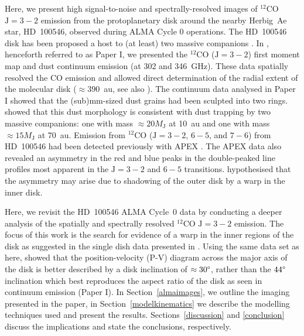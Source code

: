 \documentclass[onecolumn]{aastex6}
\begin{document}
Here, we present high signal-to-noise and spectrally-resolved
images of $^{12}$CO $\mathrm{J}=3-2$ emission from the protoplanetary
disk around the nearby Herbig~Ae star, HD~100546, observed during ALMA Cycle 0 operations.
The HD~100546 disk has been proposed a host to (at least) two
massive companions \citep[see, e.g.,][]{acke06,quanz13,walsh14}.
In \citet{walsh14}, henceforth referred to as Paper I,
we presented the $^{12}$CO ($\mathrm{J}=3-2$) first moment map
and dust continuum emission (at 302 and 346~GHz).
These data spatially resolved the CO emission and allowed direct
determination of the radial extent of the molecular disk ($\approx 390$~au,
see also \citealt{pineda14}).
The continuum data analysed in Paper I showed that the (sub)mm-sized dust grains
had been sculpted into two rings.
\citet{pinilla15} showed that this
dust morphology is consistent with dust trapping by two massive companions:
one with mass $\approx 20 M_\mathrm{J}$ at 10~au and one with mass
$\approx 15 M_\mathrm{J}$ at 70~au.
Emission from $^{12}$CO ($\mathrm{J}=3-2$, $6-5$, and $7-6$) from HD~100546
had been detected previously with APEX \citep{panic10}.
The APEX data also revealed an asymmetry in the red and blue peaks
in the double-peaked line profiles most apparent in the $\mathrm{J}=3-2$
and $6-5$ transitions.
\citet{panic10} hypothesised that the asymmetry may arise
due to shadowing of the outer disk by a warp in the inner disk.

Here, we revisit the HD~100546 ALMA Cycle~0 data by conducting a deeper analysis
of the spatially and spectrally resolved $^{12}$CO $\mathrm{J}=3-2$ emission.
The focus of this work is the search for evidence of a warp in the inner
regions of the disk as suggested in the single dish data presented in
\citet{panic10}.
Using the same data set as here, \citet{pineda14} showed that the
position-velocity (P-V) diagram across the major axis of the disk is
better described by a disk inclination of $\approx 30\degree$,
rather than the $44\degree$ inclination which best reproduces the
aspect ratio of the disk as
seen in continuum emission (Paper I).
In Section~\ref{almaimages}, we outline the imaging presented
in the paper, in
Section~\ref{modelkinematics} we describe the modelling techniques
used and present the results.
Sections~\ref{discussion} and \ref{conclusion} discuss the implications
and state the conclusions, respectively.

\end{document}
